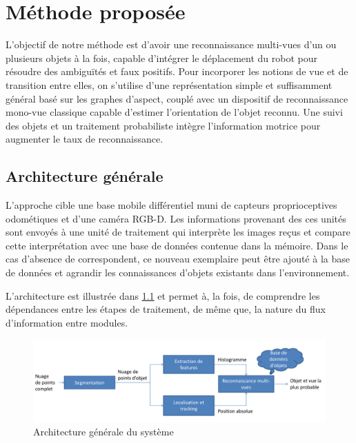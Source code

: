 
\chapter{Méthode proposée}

L'objectif de notre méthode est d'avoir une reconnaissance multi-vues d'un ou plusieurs objets à la fois, capable d'intégrer le déplacement du robot pour résoudre des ambiguïtés et faux positifs. Pour incorporer les notions de vue et de transition entre elles, on s'utilise d'une représentation simple et suffisamment général basé sur les graphes d'aspect, couplé avec un dispositif de reconnaissance mono-vue classique capable d'estimer l'orientation de l'objet reconnu. Une suivi des objets et un traitement probabiliste intègre l'information motrice pour augmenter le taux de reconnaissance.

\section{Architecture générale}
L'approche cible une base mobile différentiel muni de capteurs proprioceptives odométiques et d'une caméra RGB-D. Les informations provenant des ces unités sont envoyés à une unité de traitement qui interprète les images reçus et compare cette interprétation avec une base de données contenue dans la mémoire. Dans le cas d'absence de correspondent, ce nouveau exemplaire peut être ajouté à la base de données et agrandir les connaissances d'objets existants dans l'environnement. 

L'architecture est illustrée dans \ref{fig:architecture} et permet à, la fois, de comprendre les dépendances entre les étapes de traitement, de même que, la nature du flux d'information entre modules.

\begin{figure}[H]
  \centering
  \includegraphics[width=\textwidth]{gen_arc.pdf}
  \caption{Architecture générale du système}
  \label{fig:architecture}
\end{figure}

